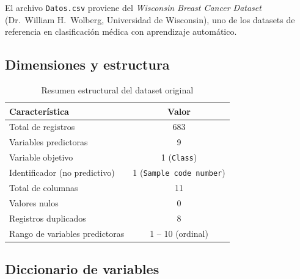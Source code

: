 \documentclass[11pt,a4paper]{article}
\begin{document}
El archivo \texttt{Datos.csv} proviene del \textit{Wisconsin Breast Cancer Dataset} (Dr.\ William H.\ Wolberg, Universidad de Wisconsin), uno de los datasets de referencia en clasificación médica con aprendizaje automático.

\subsection{Dimensiones y estructura}

\begin{table}[H]
\centering
\caption{Resumen estructural del dataset original}
\begin{tabular}{lc}
\toprule
\textbf{Característica} & \textbf{Valor} \\
\midrule
Total de registros & 683 \\
Variables predictoras & 9 \\
Variable objetivo & 1 (\texttt{Class}) \\
Identificador (no predictivo) & 1 (\texttt{Sample code number}) \\
Total de columnas & 11 \\
Valores nulos & 0 \\
Registros duplicados & 8 \\
Rango de variables predictoras & 1 -- 10 (ordinal) \\
\bottomrule
\end{tabular}
\end{table}

\subsection{Diccionario de variables}
\end{document}
